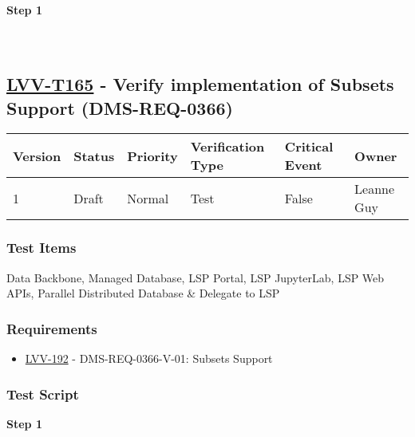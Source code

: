 \textbf{Step 1}\\
~\\
~\\

\hypertarget{lvv-t165---verify-implementation-of-subsets-support-dms-req-0366}{%
\subsection{\texorpdfstring{\href{https://jira.lsstcorp.org/secure/Tests.jspa\#/testCase/LVV-T165}{LVV-T165}
- Verify implementation of Subsets Support
(DMS-REQ-0366)}{LVV-T165 - Verify implementation of Subsets Support (DMS-REQ-0366)}}\label{lvv-t165---verify-implementation-of-subsets-support-dms-req-0366}}

\begin{longtable}[]{@{}llllll@{}}
\toprule
Version & Status & Priority & Verification Type & Critical Event &
Owner\tabularnewline
\midrule
\endhead
1 & Draft & Normal & Test & False & Leanne Guy\tabularnewline
\bottomrule
\end{longtable}

\hypertarget{test-items-65}{%
\subsubsection{Test Items}\label{test-items-65}}

Data Backbone, Managed Database, LSP Portal, LSP JupyterLab, LSP Web
APIs, Parallel Distributed Database \& Delegate to LSP

\hypertarget{requirements-65}{%
\subsubsection{Requirements}\label{requirements-65}}

\begin{itemize}
\tightlist
\item
  \href{https://jira.lsstcorp.org/browse/LVV-192}{LVV-192} -
  DMS-REQ-0366-V-01: Subsets Support
\end{itemize}

\hypertarget{test-script-65}{%
\subsubsection{Test Script}\label{test-script-65}}

\textbf{Step 1}\\
~\\
~\\

